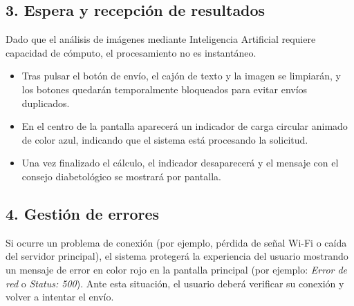 \subsection*{3. Espera y recepción de resultados}
Dado que el análisis de imágenes mediante Inteligencia Artificial requiere capacidad de cómputo, el procesamiento no es instantáneo. 
\begin{itemize}
    \item Tras pulsar el botón de envío, el cajón de texto y la imagen se limpiarán, y los botones quedarán temporalmente bloqueados para evitar envíos duplicados.
    \item En el centro de la pantalla aparecerá un indicador de carga circular animado de color azul, indicando que el sistema está procesando la solicitud.
    \item Una vez finalizado el cálculo, el indicador desaparecerá y el mensaje con el consejo diabetológico se mostrará por pantalla.
\end{itemize}

\subsection*{4. Gestión de errores}
Si ocurre un problema de conexión (por ejemplo, pérdida de señal Wi-Fi o caída del servidor principal), el sistema protegerá la experiencia del usuario mostrando un mensaje de error en color rojo en la pantalla principal (por ejemplo: \textit{Error de red} o \textit{Status: 500}). Ante esta situación, el usuario deberá verificar su conexión y volver a intentar el envío.

